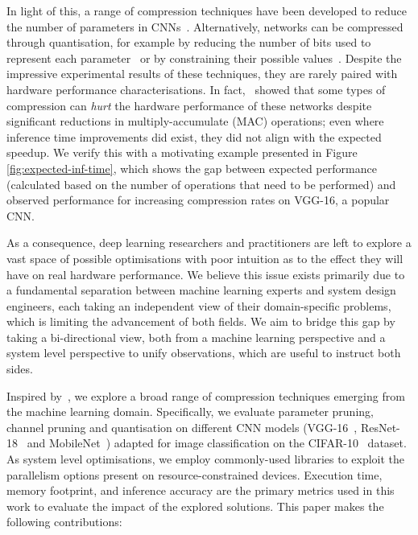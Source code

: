 \documentclass[conference]{IEEEtran}
\begin{document}
In light of this, a range of compression techniques have been developed to reduce the number of parameters in CNNs~\cite{han2015deep,ye2018rethinking,dong2017learning,louizos2017bayesian,moonshine,condensenet}. Alternatively, networks can be compressed through quantisation, for example by reducing the number of bits used to represent each parameter~\cite{zhou_2017_incremental} or by constraining their possible values~\cite{courbariaux_2015_binaryconnect,chen_2015_hashing}. Despite the impressive experimental results of these techniques, they are rarely paired with hardware performance characterisations. In fact,~\cite{yu2017scalpel} showed that some types of compression can \textit{hurt} the hardware performance of these networks despite significant reductions in multiply-accumulate (MAC) operations; even where inference time improvements did exist, they did not align with the expected speedup. We verify this with a motivating example presented in Figure \ref{fig:expected-inf-time}, which shows the gap between expected performance (calculated based on the number of operations that need to be performed) and observed performance for increasing compression rates on VGG-16, a popular CNN. 

As a consequence, deep learning researchers and practitioners are left to explore a vast space of possible optimisations with poor intuition as to the effect they will have on real hardware performance. We believe this issue exists primarily due to a fundamental separation between machine learning experts and system design engineers, each taking an independent view of their domain-specific problems, which is limiting the advancement of both fields. We aim to bridge this gap by taking a bi-directional view, both from a machine learning perspective and a system level perspective to unify observations, which are useful to instruct both sides.

Inspired by~\cite{yu2017scalpel}, we explore a broad range of compression techniques emerging from the machine learning domain. Specifically, we evaluate parameter pruning, channel pruning and quantisation on different CNN models (VGG-16~\cite{vgg}, ResNet-18~\cite{he2016deep} and MobileNet~\cite{mobilenet}) adapted for image classification on the CIFAR-10~\cite{cifar} dataset. As system level optimisations, we employ commonly-used libraries to exploit the parallelism options present on resource-constrained devices. Execution time, memory footprint, and inference accuracy are the primary metrics used in this work to evaluate the impact of the explored solutions. This paper makes the following contributions:
\end{document}
